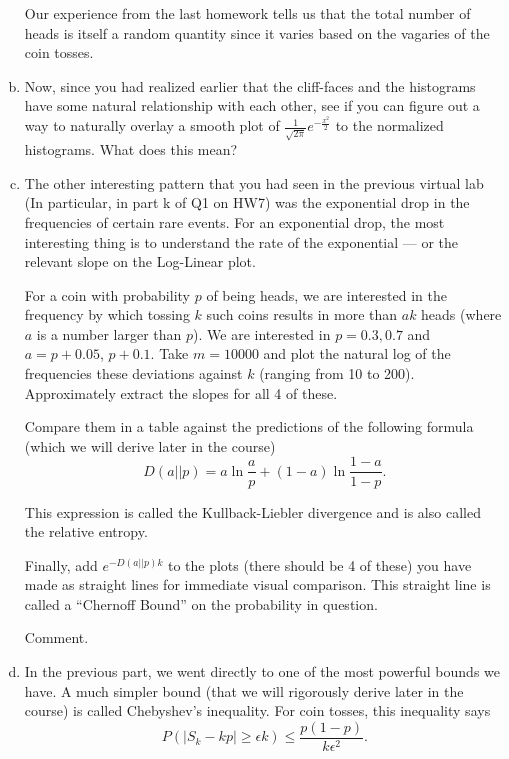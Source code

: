 \documentclass[]{article}
\begin{document}
\begin{qunlist}
\begin{enumerate}[a)]
 Our experience from the last homework tells us that the total number
 of heads is itself a random quantity since it varies based on the
 vagaries of the coin tosses.


\qpart 
\item Now, since you had realized earlier that the cliff-faces and the
  histograms have some natural relationship with each other, see if
  you can figure out a way to naturally overlay a smooth plot of
  $\frac{1}{\sqrt{2\pi}} e^{-\frac{x^2}{2}}$ to the normalized
  histograms. What does this mean?



\qpart
\item The other interesting pattern that you had seen in the previous
  virtual lab (In particular, in part k of Q1 on HW7) was the
  exponential drop in the frequencies of certain rare events. For an
  exponential drop, the most interesting thing is to understand the
  rate of the exponential --- or the relevant slope on the Log-Linear
  plot.  

  For a coin with probability $p$ of being heads, we are interested in
  the frequency by which tossing $k$ such coins results in more than
  $ak$ heads (where $a$ is a number larger than $p$). We are
  interested in $p=0.3,0.7$ and $a = p+0.05$,
  $p+0.1$.  Take $m = 10000$ and plot the natural log of the frequencies 
  these deviations against $k$ (ranging from 10 to 200). Approximately
  extract the slopes for all 4 of these.

  Compare them in a table against the predictions of the following
  formula (which we will derive later in the course)
  $$D(a||p) = a \ln \frac{a}{p} + (1-a) \ln \frac{1-a}{1-p}.$$
  
  This expression is called the Kullback-Liebler divergence and is also
  called the relative entropy. 

  Finally, add $e^{-D(a||p) k}$ to the plots (there should be 4 of
  these) you have made as straight lines for immediate visual
  comparison. This straight line is called a ``Chernoff Bound'' on the
  probability in question. 

  Comment. 



\qpart
\item In the previous part, we went directly to one of the most
  powerful bounds we have. A much simpler bound (that we will
  rigorously derive later in the course) is called Chebyshev's
  inequality. For coin tosses, this inequality says 
$$P(|S_k - k p| \geq \epsilon k) \leq \frac{ p (1-p)}{k \epsilon^2}.$$ 


\end{enumerate}
\end{qunlist}
\end{document}
